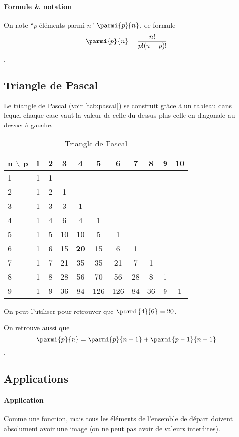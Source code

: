 \documentclass[10pt,a4paper,french]{article}
\begin{document}
\paragraph{Formule \& notation}
On note ``$p$ éléments parmi $n$'' $\parmi{p}{n}$, de formule \[ \parmi{p}{n} = \frac{n!}{p! (n-p)!} \].

\subsection{Triangle de Pascal}

Le triangle de Pascal (voir \autoref{tab:pascal}) se construit grâce à un tableau dans lequel chaque case vaut la valeur de celle du dessus plus celle en diagonale au dessus à gauche.

\begin{table}
\caption{\label{tab:pascal} Triangle de Pascal}
\centering
\begin{tabular}{l|cccccccccc}
n $\backslash$ p & 1 & 2 & 3 & 4 & 5 & 6 & 7 & 8 & 9 & 10 \\
\hline
1  & 1 & 1 &   &   &   &   &   &   &   &   \\
2  & 1 & 2 & 1 &   &   &   &   &   &   &   \\
3  & 1 & 3 & 3 & 1 &   &   &   &   &   &   \\
4  & 1 & 4 & 6 & 4 & 1 &   &   &   &   &   \\
5  & 1 & 5 & 10 & 10 & 5 & 1 &   &   &   &   \\
6  & 1 & 6 & 15 & \textbf{20} & 15 & 6 & 1 &   &   &   \\
7  & 1 & 7 & 21 & 35 & 35 & 21 & 7 & 1 &   &   \\
8  & 1 & 8 & 28 & 56 & 70 & 56 & 28 & 8 & 1 &   \\
9 & 1 & 9 & 36 & 84 & 126 & 126 & 84 & 36 & 9 & 1 \\
\end{tabular}
\end{table}

On peut l'utiliser pour retrouver que $\parmi{4}{6}=20$.

On retrouve aussi que \[ \parmi{p}{n} = \parmi{p}{n-1} + \parmi{p-1}{n-1} \].

\subsection{Applications}

\paragraph{Application}
Comme une fonction, mais tous les éléments de l'ensemble de départ doivent absolument avoir une image (on ne peut pas avoir de valeurs interdites).
\end{document}
